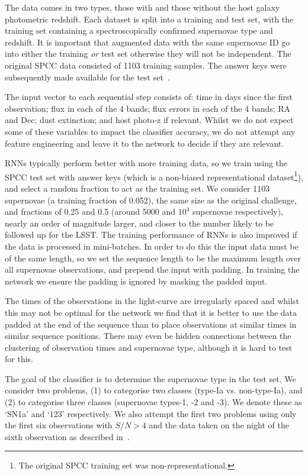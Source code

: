 \documentclass[twocolumn]{aastex61}
\begin{document}
The data comes in two types, those with and those without the host galaxy photometric redshift. Each dataset is split into a training and test set, with the training set containing a spectroscopically confirmed supernovae type and redshift. It is important that augmented data with the same supernovae ID go into either the training {\em or} test set otherwise they will not be independent. The original SPCC data consisted of 1103 training samples. The answer keys were subsequently made available for the test set~\cite{Kessler:2010qj}. 

The input vector to each sequential step consists of: time in days since the first observation; flux in each of the 4 bands; flux errors in each of the 4 bands; RA and Dec; dust extinction; and host photo-z if relevant. Whilst we do not expect some of these variables to impact the classifier accuracy, we do not attempt any feature engineering and leave it to the network to decide if they are relevant. 

RNNs typically perform better with more training data, so we train using the SPCC test set with answer keys (which is a non-biased representational dataset\footnote{The original SPCC training set was non-representational.}), and select a random fraction to act as the training set. We consider 1103 supernovae (a training fraction of 0.052), the same size as the original challenge, and fractions of 0.25 and 0.5 (around 5000 and $10^4$ supernovae respectively), nearly an order of magnitude larger, and closer to the number likely to be followed up for the LSST. The training performance of RNNs is also improved if the data is processed in mini-batches. In order to do this the input data must be of the same length, so we set the sequence length to be the maximum length over all supernovae observations, and prepend the input with padding. In training the network we ensure the padding is ignored by masking the padded input. 
 
The times of the observations in the light-curve are irregularly spaced and whilst this may not be optimal for the network we find that it is better to use the data padded at the end of the sequence than to place observations at similar times in similar sequence positions. There may even be hidden connections between the clustering of observation times and supernovae type, although it is hard to test for this.

The goal of the classifier is to determine the supernovae type in the test set. We consider two problems, (1) to categorise two classes (type-Ia vs. non-type-Ia), and (2) to categorise three classes (supernovae types-1, -2 and -3). We denote these as  `SN1a' and  `123' respectively. We also attempt the first two problems using only the first six observations with $S/N>4$ and the data taken on the night of the sixth observation as described in~\cite{Kessler:2010wk}.
\end{document}
